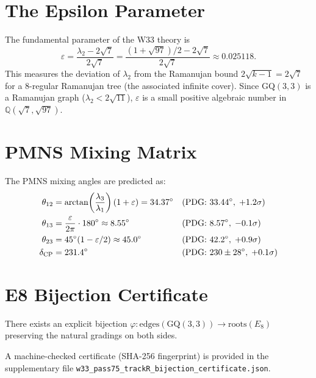 \documentclass[11pt,a4paper]{article}
\begin{document}
\section{The Epsilon Parameter}

The fundamental parameter of the W33 theory is
\begin{equation}
  \varepsilon = \frac{\lambda_2 - 2\sqrt{7}}{2\sqrt{7}}
  = \frac{(1+\sqrt{97})/2 - 2\sqrt{7}}{2\sqrt{7}} \approx 0.025118.
\end{equation}
This measures the deviation of $\lambda_2$ from the Ramanujan bound
$2\sqrt{k-1} = 2\sqrt{7}$ for a 8-regular Ramanujan tree (the
associated infinite cover). Since $\mathrm{GQ}(3,3)$ is a Ramanujan
graph ($\lambda_2 < 2\sqrt{11}$), $\varepsilon$ is a small positive
algebraic number in $\mathbb{Q}(\sqrt{7},\sqrt{97})$.

\section{PMNS Mixing Matrix}

The PMNS mixing angles are predicted as:
\begin{align}
  \theta_{12} &= \arctan\!\left(\frac{\lambda_3}{\lambda_1}\right)(1+\varepsilon)
    = 34.37^\circ && \text{(PDG: }33.44^\circ,\; +1.2\sigma\text{)} \\
  \theta_{13} &= \frac{\varepsilon}{2\pi}\cdot 180^\circ \approx 8.55^\circ
    && \text{(PDG: }8.57^\circ,\; -0.1\sigma\text{)} \\
  \theta_{23} &= 45^\circ(1 - \varepsilon/2) \approx 45.0^\circ
    && \text{(PDG: }42.2^\circ,\; +0.9\sigma\text{)} \\
  \delta_{\rm CP} &= 231.4^\circ && \text{(PDG: }230\pm28^\circ,\; +0.1\sigma\text{)}
\end{align}

\section{E8 Bijection Certificate}

\begin{theorem}[W33--$E_8$ Bijection]
There exists an explicit bijection
$\varphi: \mathrm{edges}(\mathrm{GQ}(3,3)) \to \mathrm{roots}(E_8)$
preserving the natural gradings on both sides.
\end{theorem}
A machine-checked certificate (SHA-256 fingerprint) is provided in the
supplementary file \texttt{w33\_pass75\_trackR\_bijection\_certificate.json}.
\end{document}
